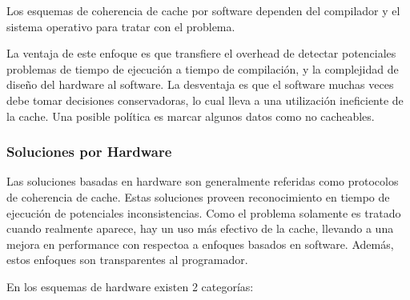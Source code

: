 Los esquemas de coherencia de cache por software dependen del compilador y el sistema operativo para tratar con el problema.

La ventaja de este enfoque es que transfiere el overhead de detectar potenciales problemas de tiempo de ejecuci\'on a tiempo de compilaci\'on, y
la complejidad de dise\~no del hardware al software. La desventaja es que el software muchas veces debe tomar decisiones conservadoras, lo cual
lleva a una utilizaci\'on ineficiente de la cache. Una posible pol\'itica es marcar algunos datos como no cacheables.

\subsubsection{Soluciones por Hardware}

Las soluciones basadas en hardware son generalmente referidas como protocolos de coherencia de cache. Estas soluciones proveen reconocimiento
en tiempo de ejecuci\'on de potenciales inconsistencias. Como el problema solamente es tratado cuando realmente aparece, hay un uso m\'as efectivo
de la cache, llevando a una mejora en performance con respectoa a enfoques basados en software. Adem\'as, estos enfoques son transparentes al programador.

En los esquemas de hardware existen 2 categor\'ias:

